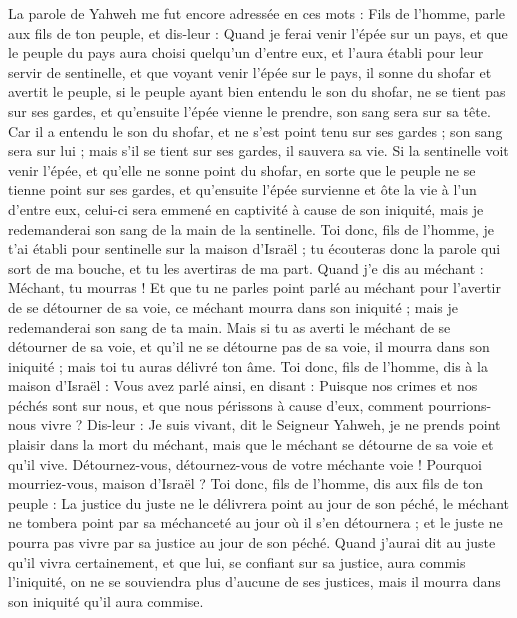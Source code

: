 \begin{multicols}{2}
\VerseOne{}La parole de Yahweh me fut encore adressée en ces mots :
Fils de l'homme, parle aux fils de ton peuple, et dis-leur : Quand je ferai venir l'épée sur un pays, et que le peuple du pays aura choisi quelqu'un d'entre eux, et l'aura établi pour leur servir de sentinelle,
et que voyant venir l'épée sur le pays, il sonne du shofar et avertit le peuple,
si le peuple ayant bien entendu le son du shofar, ne se tient pas sur ses gardes, et qu'ensuite l'épée vienne le prendre, son sang sera sur sa tête.
Car il a entendu le son du shofar, et ne s'est point tenu sur ses gardes ; son sang sera sur lui ; mais s'il se tient sur ses gardes, il sauvera sa vie.
Si la sentinelle voit venir l'épée, et qu'elle ne sonne point du shofar, en sorte que le peuple ne se tienne point sur ses gardes, et qu'ensuite l'épée survienne et ôte la vie à l'un d'entre eux, celui-ci sera emmené en captivité à cause de son iniquité, mais je redemanderai son sang de la main de la sentinelle.
Toi donc, fils de l'homme, je t'ai établi pour sentinelle sur la maison d'Israël ; tu écouteras donc la parole qui sort de ma bouche, et tu les avertiras de ma part.
Quand j'e dis au méchant : Méchant, tu mourras ! Et que tu ne parles point parlé au méchant pour l'avertir de se détourner de sa voie, ce méchant mourra dans son iniquité ; mais je redemanderai son sang de ta main.
Mais si tu as averti le méchant de se détourner de sa voie, et qu'il ne se détourne pas de sa voie, il mourra dans son iniquité ; mais toi tu auras délivré ton âme.
Toi donc, fils de l'homme, dis à la maison d'Israël : Vous avez parlé ainsi, en disant : Puisque nos crimes et nos péchés sont sur nous, et que nous périssons à cause d'eux, comment pourrions-nous vivre ?
Dis-leur : Je suis vivant, dit le Seigneur Yahweh, je ne prends point plaisir dans la mort du méchant, mais que le méchant se détourne de sa voie et qu'il vive. Détournez-vous, détournez-vous de votre méchante voie ! Pourquoi mourriez-vous, maison d'Israël ?
Toi donc, fils de l'homme, dis aux fils de ton peuple : La justice du juste ne le délivrera point au jour de son péché, le méchant ne tombera point par sa méchanceté au jour où il s'en détournera ; et le juste ne pourra pas vivre par sa justice au jour de son péché.
Quand j'aurai dit au juste qu'il vivra certainement, et que lui, se confiant sur sa justice, aura commis l'iniquité, on ne se souviendra plus d'aucune de ses justices, mais il mourra dans son iniquité qu'il aura commise.

\end{multicols}
